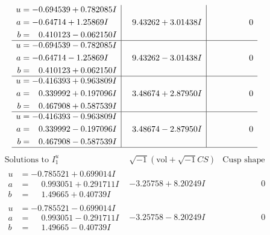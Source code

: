 \documentclass[1p]{elsarticle_modified}
\theoremstyle{definition}
\newcommand{\I}{\sqrt{-1}}
\begin{document}
$$\begin{array}{c|c|c}
\begin{aligned}
u &= -0.694539 + 0.782085 I \\
a &= -0.64714 + 1.25869 I \\
b &= \phantom{-}0.410123 - 0.062150 I\end{aligned}
 & \phantom{-}9.43262 + 3.01438 I & \phantom{-0.000000 } 0 \\ \hline\begin{aligned}
u &= -0.694539 - 0.782085 I \\
a &= -0.64714 - 1.25869 I \\
b &= \phantom{-}0.410123 + 0.062150 I\end{aligned}
 & \phantom{-}9.43262 - 3.01438 I & \phantom{-0.000000 } 0 \\ \hline\begin{aligned}
u &= -0.416393 + 0.963809 I \\
a &= \phantom{-}0.339992 + 0.197096 I \\
b &= \phantom{-}0.467908 + 0.587539 I\end{aligned}
 & \phantom{-}3.48674 + 2.87950 I & \phantom{-0.000000 } 0 \\ \hline\begin{aligned}
u &= -0.416393 - 0.963809 I \\
a &= \phantom{-}0.339992 - 0.197096 I \\
b &= \phantom{-}0.467908 - 0.587539 I\end{aligned}
 & \phantom{-}3.48674 - 2.87950 I & \phantom{-0.000000 } 0\\
 \hline 
 \end{array}$$\newpage$$\begin{array}{c|c|c}  
\text{Solutions to }I^u_{1}& \I (\text{vol} + \sqrt{-1}CS) & \text{Cusp shape}\\
 \hline 
\begin{aligned}
u &= -0.785521 + 0.699014 I \\
a &= \phantom{-}0.993051 + 0.291711 I \\
b &= \phantom{-}1.49665 + 0.40739 I\end{aligned}
 & -3.25758 + 8.20249 I & \phantom{-0.000000 } 0 \\ \hline\begin{aligned}
u &= -0.785521 - 0.699014 I \\
a &= \phantom{-}0.993051 - 0.291711 I \\
b &= \phantom{-}1.49665 - 0.40739 I\end{aligned}
 & -3.25758 - 8.20249 I & \phantom{-0.000000 } 0 \\ \hline\begin{aligned}

\end{aligned}
\end{array}$$
\end{document}
